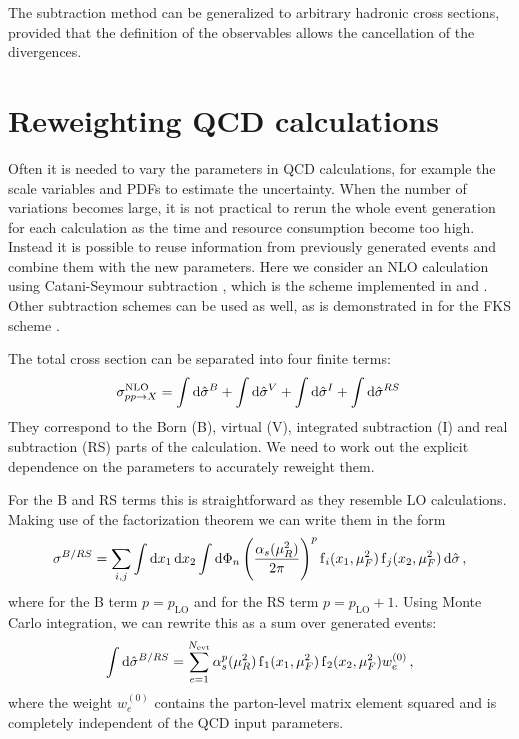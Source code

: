 The subtraction method can be generalized to arbitrary hadronic cross sections, provided that the definition of the observables allows the cancellation of the divergences.
%
\section{Reweighting QCD calculations}
Often it is needed to vary the parameters in QCD calculations, for example the scale variables and PDFs to estimate the uncertainty.
When the number of variations becomes large, it is not practical to rerun the whole event generation for each calculation as the time and resource consumption become too high.
Instead it is possible to reuse information from previously generated events and combine them with the new parameters.
Here we consider an NLO calculation using Catani-Seymour subtraction \cite{catani_seymour1997}, which is the scheme implemented in \sherpa{} and \mcgrid{}.
Other subtraction schemes can be used as well, as is demonstrated in \cite{amcfast} for the FKS scheme \cite{fks_a,fks_b}.

The total cross section can be separated into four finite terms:
%
\begin{equation}
	\sigma^\text{NLO}_{pp \rightarrow X} = \int \dif \hat \sigma^B + \int \dif \hat \sigma^V + \int \dif \hat \sigma^I + \int \dif \hat \sigma^{RS} \,
\end{equation}
%
They correspond to the Born (B), virtual (V), integrated subtraction (I) and real subtraction (RS) parts of the calculation.
We need to work out the explicit dependence on the parameters to accurately reweight them.

For the B and RS terms this is straightforward as they resemble LO calculations.
Making use of the factorization theorem we can write them in the form
%
\begin{equation}
	\sigma^{B/RS} = \sum_{i,j} \int \dif x_1 \dif x_2 \int \dif \Phi_n \left( \frac{\alpha_s(\mu_R^2)}{2 \pi} \right)^p \pdf_i(x_1,\mu_F^2) \pdf_j(x_2,\mu_F^2) \dif \hat\sigma \, ,
\end{equation}
%
where for the B term $p = p_\text{LO}$ and for the RS term $p = p_\text{LO} + 1$.
Using Monte Carlo integration, we can rewrite this as a sum over generated events:
%
\begin{equation}
  \int \dif \hat \sigma^{B/RS} = \sum_{e=1}^{N_\text{evt}} \alpha_s^p(\mu_R^2) \pdf_1(x_1,\mu_F^2) \pdf_2(x_2,\mu_F^2) w_e^{(0)} \, ,
  \label{eq:reweight_lo}
\end{equation}
%
where the weight $w_e^{(0)}$ contains the parton-level matrix element squared and is completely independent of the QCD input parameters.


